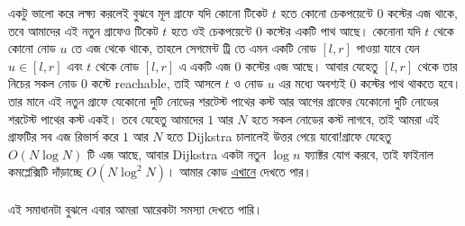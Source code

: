 \documentclass[11pt]{article}
\begin{document}
একটু ভালো করে লক্ষ্য করলেই বুঝবে মূল গ্রাফে যদি কোনো টিকেট $t$ হতে কোনো চেকপয়েন্টে $0$ কস্টের এজ থাকে, তবে আমাদের এই নতুন গ্রাফেও টিকেট $t$ হতে ওই চেকপয়েন্টে $0$ কস্টের একটি পাথ আছে। কেনোনা যদি $t$ থেকে কোনো নোড $u$ তে এজ থেকে থাকে, তাহলে সেগমেন্ট ট্রি তে এমন একটি নোড $[l,r]$ পাওয়া যাবে যেন $u \in [l,r]$ এবং $t$ থেকে নোড $[l,r]$ এ একটি এজ $0$ কস্টের এজ আছে। আবার যেহেতু $[l,r]$ থেকে তার নিচের সকল নোড $0$ কস্টে reachable, তাই আসলে $t$ ও নোড $u$ এর মধ্যে অবশ্যই $0$ কস্টের পাথ থাকতে হবে। তার মানে এই নতুন গ্রাফে যেকোনো দুটি নোডের শরটেস্ট পাথের কস্ট আর আগের গ্রাফের যেকোনো দুটি নোডের শরটেস্ট পাথের কস্ট একই। তবে যেহেতু আমাদের $1$ আর $N$ হতে সকল নোডের কস্ট লাগবে, তাই আমরা এই গ্রাফটির সব এজ রিভার্স করে $1$ আর $N$ হতে Dijkstra চালালেই উত্তর পেয়ে যাবো!গ্রাফে যেহেতু $O(N \log N)$ টি এজ আছে, আবার Dijkstra একটা নতুন $\log n$ ফ্যাক্টর যোগ করবে, তাই ফাইনাল কমপ্লেক্সিটি দাঁড়াচ্ছে $O(N\log^2 N)$। আমার কোড \href{https://pastebin.ubuntu.com/p/ZyVfJbYcQ4/}{এখানে} দেখতে পার।
\\ \\
এই সমাধানটা বুঝলে এবার আমরা আরেকটা সমস্যা দেখতে পারি। 
\end{document}

